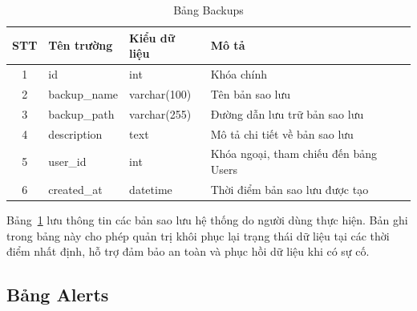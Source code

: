 \documentclass[../DoAn.tex]{subfiles}
\begin{document}
\begin{table}[H]
\centering
\begin{tabular}{|c|l|l|l|}
\hline
\textbf{STT} & \textbf{Tên trường}   & \textbf{Kiểu dữ liệu} & \textbf{Mô tả}                              \\ \hline
1            & id                    & int                  & Khóa chính          \\ \hline
2            & backup\_name          & varchar(100)         & Tên bản sao lưu                              \\ \hline
3            & backup\_path          & varchar(255)         & Đường dẫn lưu trữ bản sao lưu                 \\ \hline
4            & description           & text                 & Mô tả chi tiết về bản sao lưu                \\ \hline
5            & user\_id              & int                  & Khóa ngoại, tham chiếu đến bảng Users        \\ \hline
6            & created\_at           & datetime             & Thời điểm bản sao lưu được tạo               \\ \hline
\end{tabular}
\caption{Bảng Backups}
\label{tab:backups}
\end{table}

Bảng~\ref{tab:backups} lưu thông tin các bản sao lưu hệ thống do người dùng thực hiện. Bản ghi trong bảng này cho phép quản trị khôi phục lại trạng thái dữ liệu tại các thời điểm nhất định, hỗ trợ đảm bảo an toàn và phục hồi dữ liệu khi có sự cố.

\subsection{Bảng Alerts}
\end{document}

